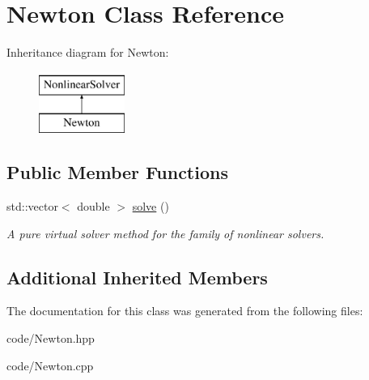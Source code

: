 \hypertarget{class_newton}{}\section{Newton Class Reference}
\label{class_newton}
Inheritance diagram for Newton\+:\begin{figure}[H]
\begin{center}
\leavevmode
\includegraphics[height=2.000000cm]{class_newton}
\end{center}
\end{figure}
\subsection*{Public Member Functions}
\begin{DoxyCompactItemize}
\item 
std\+::vector$<$ double $>$ \hyperlink{class_newton_a163b11ba9f55e74ec8713e3957576721}{solve} ()\hypertarget{class_newton_a163b11ba9f55e74ec8713e3957576721}{}\label{class_newton_a163b11ba9f55e74ec8713e3957576721}

\begin{DoxyCompactList}\small\item\em A pure virtual solver method for the family of nonlinear solvers. \end{DoxyCompactList}\end{DoxyCompactItemize}
\subsection*{Additional Inherited Members}


The documentation for this class was generated from the following files\+:\begin{DoxyCompactItemize}
\item 
code/Newton.\+hpp\item 
code/Newton.\+cpp\end{DoxyCompactItemize}

